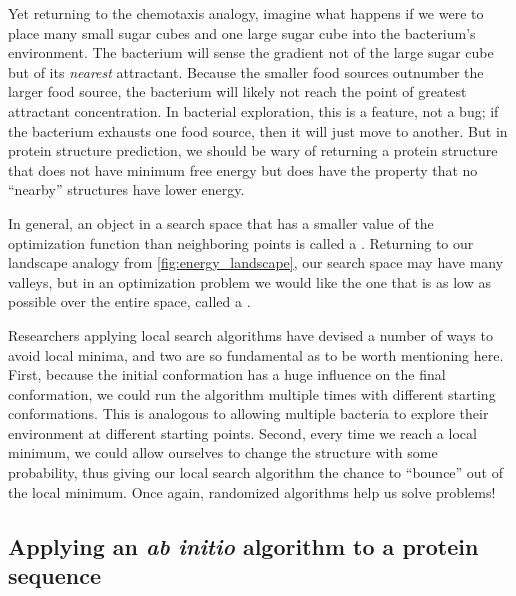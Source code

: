 Yet returning to the chemotaxis analogy, imagine what happens if we were to place many small sugar cubes and one large sugar cube into the bacterium's environment. The bacterium will sense the gradient not of the large sugar cube but of its \textit{nearest} attractant. Because the smaller food sources outnumber the larger food source, the bacterium will likely not reach the point of greatest attractant concentration. In bacterial exploration, this is a feature, not a bug; if the bacterium exhausts one food source, then it will just move to another. But in protein structure prediction, we should be wary of returning a protein structure that does not have minimum free energy but does have the property that no ``nearby'' structures have lower energy.

In general, an object in a search space that has a smaller value of the optimization function than neighboring points is called a . Returning to our landscape analogy from \autoref{fig:energy_landscape}, our search space may have many valleys, but in an optimization problem we would like the one that is as low as possible over the entire space, called a .\\

\begin{qbox}\end{qbox}

Researchers applying local search algorithms have devised a number of ways to avoid local minima, and two are so fundamental as to be worth mentioning here. First, because the initial conformation has a huge influence on the final conformation, we could run the algorithm multiple times with different starting conformations. This is analogous to allowing multiple bacteria to explore their environment at different starting points. Second, every time we reach a local minimum, we could allow ourselves to change the structure with some probability, thus giving our local search algorithm the chance to ``bounce'' out of the local minimum. Once again, randomized algorithms help us solve problems!

\FloatBarrier
{}
\subsection{Applying an \textit{ab initio} algorithm to a protein sequence}

